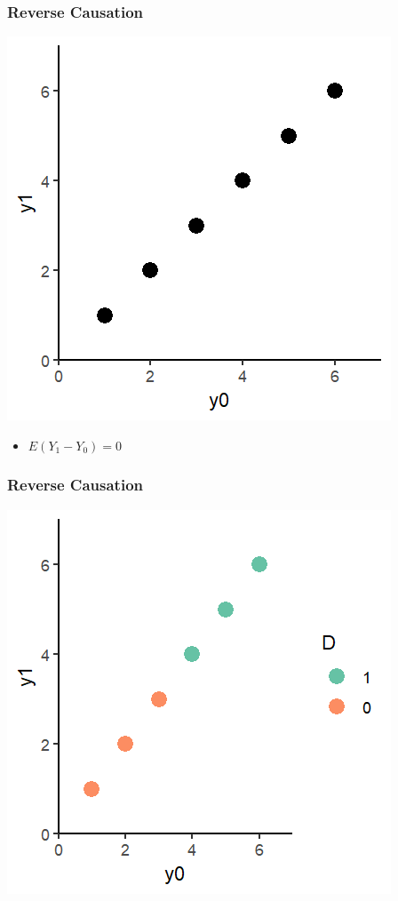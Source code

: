 \documentclass[xcolor=x11names,compress]{beamer}\usepackage[]{graphicx}\usepackage[]{color}
\makeatletter
\def\maxwidth{ %
  \ifdim\Gin@nat@width>\linewidth
    \linewidth
  \else
    \Gin@nat@width
  \fi
}
\newenvironment{knitrout}{}{} %
\renewcommand{\(}{\begin{columns}}
\renewcommand{\)}{\end{columns}}
\newcommand{\<}[1]{\begin{column}{#1}}
\renewcommand{\>}{\end{column}}
\makeatother
\begin{document}
\begin{frame}
\frametitle{Reverse Causation}
\begin{knitrout}
\color{fgcolor}
\includegraphics[width=\maxwidth]{figure/reverse3-1} 

\end{knitrout}
\begin{itemize}
\item $E(Y_1-Y_0) = 0$
\end{itemize}
\end{frame}

\begin{frame}
\frametitle{Reverse Causation}
\begin{knitrout}
\color{fgcolor}
\includegraphics[width=\maxwidth]{figure/reverse5-1} 

\end{knitrout}
\end{frame}
\end{document}
